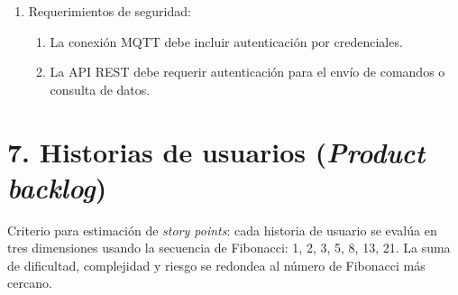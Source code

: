 \documentclass[
11pt, %
]{charter}
\begin{document}
\begin{enumerate}
	\item Requerimientos de seguridad:
		\begin{enumerate}
			\item La conexión MQTT debe incluir autenticación por credenciales.
			\item La API REST debe requerir autenticación para el envío de comandos o consulta de datos.
	 	\end{enumerate}
\end{enumerate}

\section{7. Historias de usuarios (\textit{Product backlog})}
\label{sec:backlog}
Criterio para estimación de \textit{story points}: cada historia de usuario se evalúa en tres
dimensiones usando la secuencia de Fibonacci: 1, 2, 3, 5, 8, 13, 21. La suma de dificultad,
complejidad y riesgo se redondea al número de Fibonacci más cercano.
\end{document}
